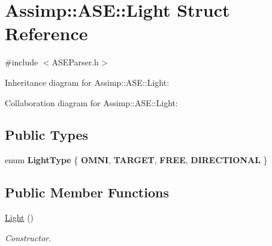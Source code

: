 \hypertarget{struct_assimp_1_1_a_s_e_1_1_light}{\section{Assimp\+:\+:A\+S\+E\+:\+:Light Struct Reference}
\label{struct_assimp_1_1_a_s_e_1_1_light}
}


{\ttfamily \#include $<$A\+S\+E\+Parser.\+h$>$}



Inheritance diagram for Assimp\+:\+:A\+S\+E\+:\+:Light\+:


Collaboration diagram for Assimp\+:\+:A\+S\+E\+:\+:Light\+:
\subsection*{Public Types}
\begin{DoxyCompactItemize}
\item 
\hypertarget{struct_assimp_1_1_a_s_e_1_1_light_a1a0b98d80a23ec89a16d96948362a755}{enum {\bfseries Light\+Type} \{ {\bfseries O\+M\+N\+I}, 
{\bfseries T\+A\+R\+G\+E\+T}, 
{\bfseries F\+R\+E\+E}, 
{\bfseries D\+I\+R\+E\+C\+T\+I\+O\+N\+A\+L}
 \}}\label{struct_assimp_1_1_a_s_e_1_1_light_a1a0b98d80a23ec89a16d96948362a755}

\end{DoxyCompactItemize}
\subsection*{Public Member Functions}
\begin{DoxyCompactItemize}
\item 
\hypertarget{struct_assimp_1_1_a_s_e_1_1_light_aa3c58a594ce6824f52a6f06cca5b959f}{\hyperlink{struct_assimp_1_1_a_s_e_1_1_light_aa3c58a594ce6824f52a6f06cca5b959f}{Light} ()}\label{struct_assimp_1_1_a_s_e_1_1_light_aa3c58a594ce6824f52a6f06cca5b959f}

\begin{DoxyCompactList}\small\item\em Constructor. \end{DoxyCompactList}\end{DoxyCompactItemize}
